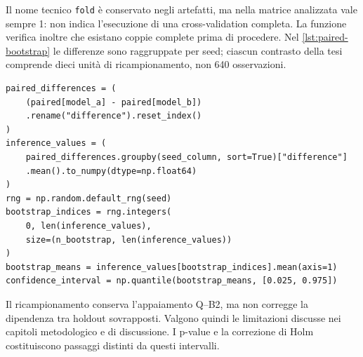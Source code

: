Il nome tecnico \texttt{fold} è conservato negli artefatti, ma nella
matrice analizzata vale sempre 1: non indica l'esecuzione di una
cross-validation completa. La funzione verifica inoltre che esistano
coppie complete prima di procedere. Nel \cref{lst:paired-bootstrap}
le differenze sono raggruppate per seed; ciascun contrasto della tesi
comprende dieci unità di ricampionamento, non 640 osservazioni.

\begin{code}
\begin{verbatim}
paired_differences = (
    (paired[model_a] - paired[model_b])
    .rename("difference").reset_index()
)
inference_values = (
    paired_differences.groupby(seed_column, sort=True)["difference"]
    .mean().to_numpy(dtype=np.float64)
)
rng = np.random.default_rng(seed)
bootstrap_indices = rng.integers(
    0, len(inference_values),
    size=(n_bootstrap, len(inference_values))
)
bootstrap_means = inference_values[bootstrap_indices].mean(axis=1)
confidence_interval = np.quantile(bootstrap_means, [0.025, 0.975])
\end{verbatim}
\caption{Bootstrap percentile sulla media delle differenze appaiate.}
\label{lst:paired-bootstrap}
\end{code}

Il ricampionamento conserva l'appaiamento Q--B2, ma non corregge
la dipendenza tra holdout sovrapposti. Valgono quindi le limitazioni
discusse nei capitoli metodologico e di discussione. I p-value e la
correzione di Holm costituiscono passaggi distinti da questi intervalli.
